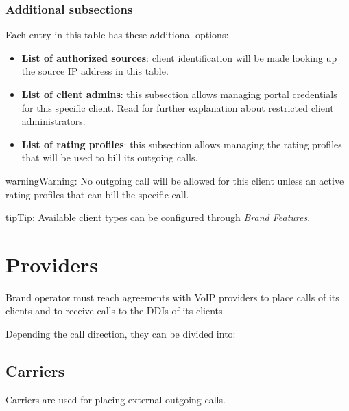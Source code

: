 \documentclass[letterpaper,10pt,english]{sphinxmanual}
\begin{document}
\subsubsection{Additional subsections}
\label{administration_portal/brand/clients/wholesale:additional-subsections}
Each entry in this table has these additional options:
\begin{itemize}
\item {} 
\textbf{List of authorized sources}: client identification will be made looking up the source IP address in this table.

\item {} 
\textbf{List of client admins}: this subsection allows managing portal credentials for this specific client. Read {\hyperref[api_rest/acls:acls]{}}
for further explanation about restricted client administrators.

\item {} 
\textbf{List of rating profiles}: this subsection allows managing the rating profiles that will be used to bill its outgoing calls.

\end{itemize}

\begin{notice}{warning}{Warning:}
No outgoing call will be allowed for this client unless an active rating profiles that can
bill the specific call.
\end{notice}

\begin{notice}{tip}{Tip:}
Available client types can be configured through \emph{Brand Features}.
\end{notice}


\section{Providers}
\label{administration_portal/brand/providers/index::doc}\label{administration_portal/brand/providers/index:providers}
Brand operator must reach agreements with VoIP providers to place calls of its clients and to receive calls to the
DDIs of its clients.

Depending the call direction, they can be divided into:


\subsection{Carriers}
\label{administration_portal/brand/providers/carriers:id1}\label{administration_portal/brand/providers/carriers::doc}\label{administration_portal/brand/providers/carriers:carriers}
Carriers are used for placing external outgoing calls.
\end{document}

